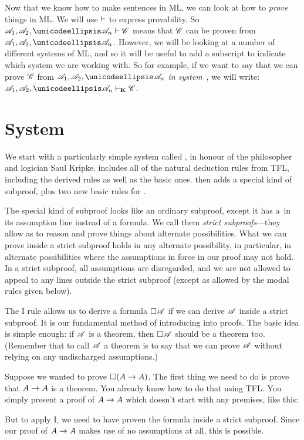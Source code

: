 Now that we know how to make sentences in ML, we can look at how to \emph{prove} things in ML. We will use $\vdash$ to express provability.  So $\metav{A}_1,\metav{A}_2, \dots \metav{A}_n \proves \metav{C}$ means that $\mathscr{C}$ can be proven from $\metav{A}_1,\metav{A}_2, \dots \metav{A}_n$. However, we will be looking at a number of different systems of ML, and so it will be useful to add a subscript to indicate which system we are working with. So for example, if we want to say that we can prove $\mathscr{C}$ from $\metav{A}_1,\metav{A}_2, \dots \metav{A}_n$ \emph{in system}~\mlK, we will write: $\metav{A}_1,\metav{A}_2, \dots \metav{A}_n \proves_\mlK \metav{C}$.

\section{System \mlK}
\label{K}

We start with a particularly simple system called \mlK, in honour of the philosopher and logician Saul Kripke. \mlK{} includes all of the natural deduction rules from TFL, including the derived rules as well as the basic ones. \mlK{} then adds a special kind of subproof, plus two new basic rules for \ebox.

The special kind of subproof looks like an ordinary subproof, except it has a~\ebox in its assumption line instead of a formula. We call them \emph{strict subproofs}---they allow as to reason and prove things about alternate possibilities. What we can prove inside a strict subproof holds in any alternate possibility, in particular, in alternate possibilities where the assumptions in force in our proof may not hold. In a strict subproof, all assumptions are disregarded, and we are not allowed to appeal to any lines outside the strict subproof (except as allowed by the modal rules given below).

The \ebox I rule allows us to derive a formula $\Box \mathscr{A}$ if we can derive $\mathscr{A}$ inside a strict subproof.  It is our fundamental method of introducing \ebox{} into proofs. The basic idea is simple enough: if $\mathscr{A}$ is a theorem, then $\Box \mathscr{A}$ should be a theorem too. (Remember that to call $\mathscr{A}$ a theorem is to say that we can prove $\mathscr{A}$ without relying on any undischarged assumptions.)

Suppose we wanted to prove $\Box(A\rightarrow A)$. The first thing we need to do is prove that $A\rightarrow A$ is a theorem. You already know how to do that using TFL. You simply present a proof of $A\rightarrow A$ which doesn't start with any premises, like this:
\begin{fitchproof}
		\open
		\AS
		\close
\end{fitchproof}
But to apply \ebox I, we need to have proven the formula inside a strict subproof.  Since our proof of $A \rightarrow A$ makes use of no assumptions at all, this is possible.
\begin{fitchproof}
		\open
		\AS
		\open
		\AS
		\close
		\close
\end{fitchproof}

